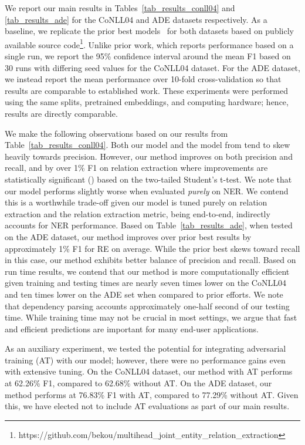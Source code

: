 \documentclass{clv3}
\begin{document}
We report our main results in Tables~\ref{tab_results_conll04} and \ref{tab_results_ade} for the CoNLL04 and ADE datasets respectively. As a baseline, we replicate the prior best models~\cite{bekoulis2018adversarial} for both datasets based on publicly available source code\footnote{https://github.com/bekou/multihead\_joint\_entity\_relation\_extraction}. Unlike prior work, which reports performance based on a single run, we report the 95\% confidence interval around the mean F1 based on 30 runs with differing seed values for the CoNLL04 dataset. For the ADE dataset, we instead report the mean performance over 10-fold cross-validation so that results are comparable to established work. These experiments were performed using the same splits, pretrained embeddings, and computing hardware; hence, results are directly comparable. 

We make the following observations based on our results from Table~\ref{tab_results_conll04}. Both our model and the model from  tend to skew heavily towards precision. However, our method improves on both precision and recall, and by over 1\% F1 on relation extraction where improvements are statistically significant () based on the two-tailed Student's t-test. We note that our model performs slightly worse when evaluated \emph{purely} on NER. We contend this is a worthwhile trade-off given our model is tuned purely on relation extraction and the relation extraction metric, being end-to-end, indirectly accounts for NER performance. Based on Table~\ref{tab_results_ade}, when tested on the ADE dataset, our method improves over prior best results by approximately 1\% F1 for RE on average. While the prior best skews toward recall in this case, our method exhibits better balance of precision and recall.  Based on run time results, we contend that our method is more computationally efficient given training and testing times are nearly seven  times lower on the CoNLL04 and ten times lower on the ADE set when compared to prior efforts. We note that dependency parsing accounts approximately one-half second of our testing time. While training time may not be crucial in most settings, we argue that fast and efficient predictions are important for many end-user applications.

As an auxiliary experiment, we tested the potential for integrating adversarial training (AT) with our model; however, there were no performance gains even with extensive tuning. On the CoNLL04 dataset, our method with AT performs at 62.26\% F1, compared to 62.68\% without AT. On the ADE dataset, our method performs at 76.83\% F1 with AT, compared to 77.29\% without AT. Given this, we have elected not to include AT evaluations as part of our main results.
\end{document}
